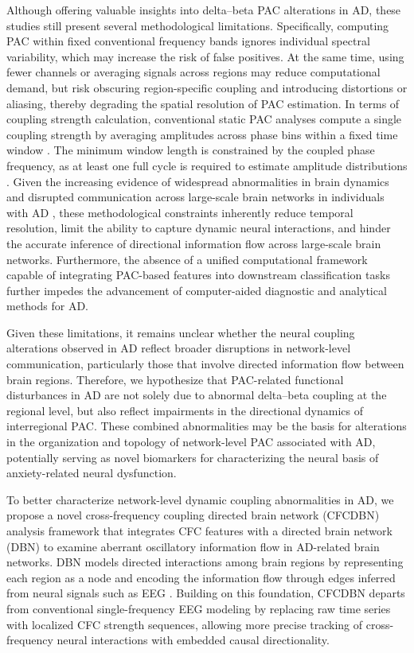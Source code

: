 \documentclass[lettersize,journal]{IEEEtran}
\begin{document}
Although offering valuable insights into delta–beta PAC alterations in AD, these studies still present several methodological limitations. Specifically, computing PAC within fixed conventional frequency bands ignores individual spectral variability, which may increase the risk of false positives.  At the same time, using fewer channels or averaging signals across regions may reduce computational demand, but risk obscuring region-specific coupling and introducing distortions or aliasing, thereby degrading the spatial resolution of PAC estimation.
In terms of coupling strength calculation, conventional static PAC analyses compute a single coupling strength by averaging amplitudes across phase bins within a fixed time window \cite{tort2010measuring}. The minimum window length is constrained by the coupled phase frequency, as at least one full cycle is required to estimate amplitude distributions \cite{voytek2013method}. Given the increasing evidence of widespread abnormalities in brain dynamics and disrupted communication across large-scale brain networks in individuals with AD \cite{wang2023analysis,cui2020disrupted,sylvester2012functional}, these methodological constraints inherently reduce temporal resolution, limit the ability to capture dynamic neural interactions, and hinder the accurate inference of directional information flow across large-scale brain networks. Furthermore, the absence of a unified computational framework capable of integrating PAC-based features into downstream classification tasks further impedes the advancement of computer-aided diagnostic and analytical methods for AD.





Given these limitations, it remains unclear whether the neural coupling alterations observed in AD reflect broader disruptions in network-level communication, particularly those that involve directed information flow between brain regions.
Therefore, we hypothesize that PAC-related functional disturbances in AD are not solely due to abnormal delta–beta coupling at the regional level, but also reflect impairments in the directional dynamics of interregional PAC.
These combined abnormalities may be the basis for alterations in the organization and topology of network-level PAC associated with AD, potentially serving as novel biomarkers for characterizing the neural basis of anxiety-related neural dysfunction.

To better characterize network-level dynamic coupling abnormalities in AD, we propose a novel cross-frequency coupling directed brain network (CFCDBN) analysis framework that integrates CFC features with a directed brain network (DBN) to examine aberrant oscillatory information flow in AD-related brain networks.
DBN models directed interactions among brain regions by representing each region as a node and encoding the information flow through edges inferred from neural signals such as EEG  \cite{chicharro2014algorithms, coito2019directed, cao2022brain}. Building on this foundation, CFCDBN departs from conventional single-frequency EEG modeling by replacing raw time series with localized CFC strength sequences, allowing more precise tracking of cross-frequency neural interactions with embedded causal directionality.
\end{document}
